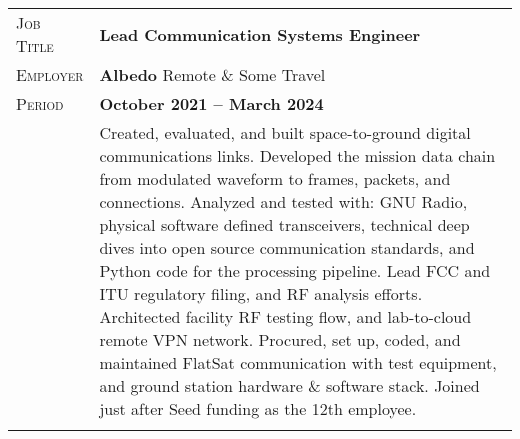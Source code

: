 \documentclass[a4paper, oneside, final]{scrartcl}
\newcommand{\gray}{\rowcolor[gray]{.90}} %
\begin{document}
\begin{center}
\begin{tabularx}{0.97\linewidth}{>{\raggedleft\scshape}p{2cm}X}
\gray Job Title & \textbf{Lead Communication Systems Engineer}\\
\gray Employer & \textbf{Albedo} \hfill Remote \& Some Travel\\
\gray Period & \textbf{October 2021 -- March 2024}\\
&
\vspace{-0.15 cm}
Created, evaluated, and built space-to-ground digital communications links. Developed the mission data chain from modulated waveform to frames, packets, and connections. Analyzed and tested with: GNU Radio, physical software defined transceivers, technical deep dives into open source communication standards, and Python code for the processing pipeline.
\newline
\newline
Lead FCC and ITU regulatory filing, and RF analysis efforts.
\newline
\newline
Architected facility RF testing flow, and lab-to-cloud remote VPN network. Procured, set up, coded, and maintained FlatSat communication with test equipment, and ground station hardware \& software stack.
\newline
\newline
Joined just after Seed funding as the 12th employee.
\\
\\
\end{tabularx}


\end{center}
\end{document}

